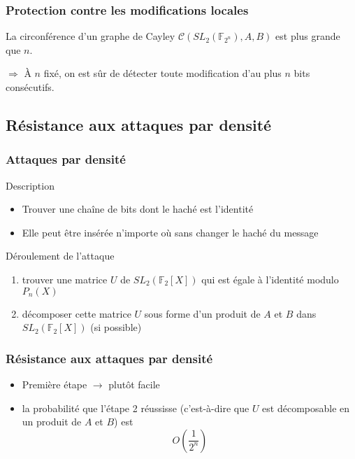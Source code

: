 \documentclass{beamer}
\newcommand{\C}{\mathcal{C}}
\newcommand{\F}{\mathbb{F}}
\begin{document}
\begin{frame}
 \frametitle{Protection contre les modifications locales}
 
 \begin{theorem}
  La circonférence d'un graphe de Cayley $\C(SL_2(\F_{2^n}), A, B)$ est 
  plus grande que $n$. 
 \end{theorem}

 $\Longrightarrow$ À $n$ fixé, on est sûr de détecter toute modification d'au plus $n$ bits consécutifs.
\end{frame}

\subsection{Résistance aux attaques par densité}

\begin{frame}
 \frametitle{Attaques par densité}

\begin{block}{Description}
\begin{itemize}
 \item Trouver une chaîne de bits dont le haché est l'identité
 \item Elle peut être insérée n'importe où sans changer le haché du message
\end{itemize}
\end{block}
\pause
\begin{block}{Déroulement de l'attaque}
\begin{enumerate}
 \item trouver une matrice $U$ de $SL_2(\F_2[X])$ qui est égale à l'identité modulo $P_n(X)$
 \item décomposer cette matrice $U$ sous forme d'un produit de $A$ et $B$ dans $SL_2(\F_2[X])$ (si possible)
\end{enumerate}
\end{block}
\end{frame}

\begin{frame}
 \frametitle{Résistance aux attaques par densité}
 \begin{itemize}
  \item Première étape $\rightarrow$ plutôt facile
  \pause
  \item la probabilité que l'étape 2 réussisse (c'est-à-dire
   que $U$ est décomposable en un produit de $A$ et $B$) est $$O\left(\frac{1}{2^n}\right)$$
 \end{itemize}
\end{frame}
\end{document}
